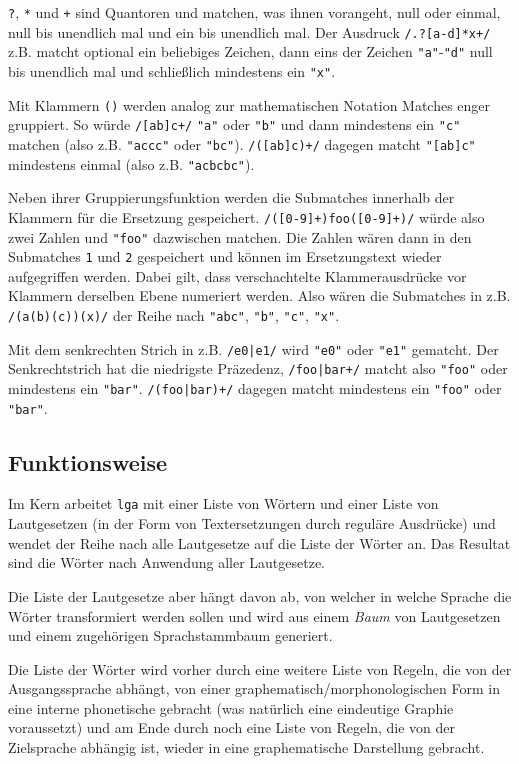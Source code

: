 \documentclass[12pt,a4paper,normalheadings]{scrartcl}
\def\tt#1{\texttt{#1}}
\def\rx#1{\texttt{/#1/}}
\def\str#1{\texttt{"#1"}}
\begin{document}
\tt{?}, \tt{*} und \tt{+} sind Quantoren
und matchen, was ihnen vorangeht, null oder einmal, null bis unendlich mal
und ein bis unendlich mal.
Der Ausdruck \rx{.?[a-d]*x+} z.B.
matcht optional ein beliebiges Zeichen, dann eins der Zeichen \str{a}-\str{d}
null bis unendlich mal und schließlich mindestens ein \str{x}.

Mit Klammern \tt{()} werden analog zur mathematischen Notation
Matches enger gruppiert.
So würde \rx{[ab]c+} \str{a} oder \str{b} und dann mindestens ein
\str{c} matchen (also z.B. \str{accc} oder \str{bc}).
\rx{([ab]c)+} dagegen matcht \str{[ab]c} mindestens einmal
(also z.B. \str{acbcbc}).

Neben ihrer Gruppierungsfunktion werden die Submatches innerhalb
der Klammern für die Ersetzung gespeichert.
\rx{([0-9]+)foo([0-9]+)} würde also zwei Zahlen und \str{foo} dazwischen
matchen.
Die Zahlen wären dann in den Submatches \tt{1} und \tt{2} gespeichert
und können im Ersetzungstext wieder aufgegriffen werden.
Dabei gilt, dass verschachtelte Klammerausdrücke vor Klammern derselben
Ebene numeriert werden. Also wären die Submatches in z.B. \rx{(a(b)(c))(x)}
der Reihe nach \str{abc}, \str{b}, \str{c}, \str{x}.

Mit dem senkrechten Strich in z.B. \rx{e0|e1} wird \str{e0}
oder \str{e1} gematcht.
Der Senkrechtstrich hat die niedrigste Präzedenz,
\rx{foo|bar+} matcht also \str{foo} oder mindestens ein \str{bar}.
\rx{(foo|bar)+} dagegen matcht mindestens ein \str{foo} oder \str{bar}.

\subsection{Funktionsweise}

Im Kern arbeitet \tt{lga} mit einer Liste von Wörtern
und einer Liste von Lautgesetzen
(in der Form von Textersetzungen durch reguläre Ausdrücke)
und wendet der Reihe nach alle Lautgesetze auf die Liste der Wörter an.
Das Resultat sind die Wörter nach Anwendung aller Lautgesetze.

Die Liste der Lautgesetze aber hängt davon ab,
von welcher in welche Sprache die Wörter transformiert werden sollen
und wird aus einem \emph{Baum} von Lautgesetzen und einem
zugehörigen Sprachstammbaum generiert.

Die Liste der Wörter wird vorher durch eine weitere Liste von Regeln,
die von der Ausgangssprache abhängt,
von einer graphematisch/morphonologischen
Form in eine interne phonetische gebracht
(was natürlich eine eindeutige Graphie voraussetzt)
und am Ende durch noch eine Liste von Regeln,
die von der Zielsprache abhängig ist,
wieder in eine graphematische Darstellung gebracht.
\end{document}

